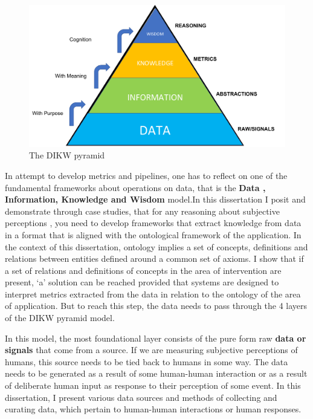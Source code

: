 \begin{figure}[t!]
    \centering
    \includegraphics[width=\columnwidth]{DIKW.pdf}
    \caption{The DIKW pyramid}
    \label{fig:dikw}
\end{figure}

In attempt to develop metrics and pipelines, one has to reflect on one of the fundamental frameworks about operations on data, that is the \textbf{Data , Information, Knowledge and Wisdom} model\cite{rowley2007wisdom}.In this dissertation I posit and demonstrate through case studies, that for any reasoning about subjective perceptions , you need to develop frameworks that extract knowledge from data in a format that is aligned with the ontological framework of the application. In the context of this dissertation, ontology implies a set of concepts, definitions and relations between entities defined around a common set of axioms. I show that if a set of relations and definitions of concepts in the area of intervention are present, `a' solution can be reached provided that systems are designed to interpret metrics extracted from the data in relation to the ontology of the area of application. But to reach this step, the data needs to pass through the 4 layers of the DIKW pyramid model.

In this model, the most foundational layer consists of the pure form raw \textbf{data or signals} that come from a source. If we are measuring subjective perceptions of humans, this source needs to be tied back to humans in some way.  The data needs to be generated as a result of some human-human interaction or as a result of deliberate human input as response to their perception of some event. In this dissertation, I present various data sources and methods of collecting and curating data, which pertain to human-human interactions or human responses. 


